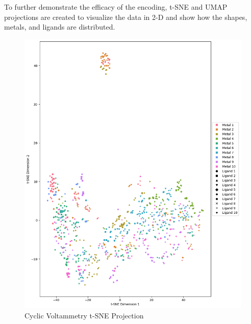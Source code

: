 To further demonstrate the efficacy of the encoding, t-SNE and UMAP projections are created to visualize the data in 2-D and show how the shapes, metals, and ligands are distributed. 
\begin{figure}[h!]
  \centering
    \includegraphics[width=1.0\textwidth]{figures/cv_tsne.png}
    \caption{Cyclic Voltammetry t-SNE Projection}
    \label{cv-tsne}
\end{figure}
